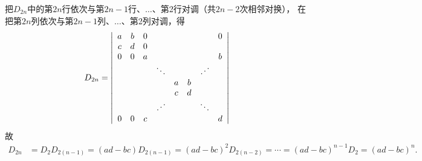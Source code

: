 \begin{jie}
  把$D_{2n}$中的第$2n$行依次与第$2n-1$行、$\ldots$、第2行对调（共$2n-2$次相邻对换），
  在把第$2n$列依次与第$2n-1$列、$\ldots$、第2列对调，得
  $$
  D_{2n} = \left|
    \begin{array}{cccccccc}
      a & b & 0 &      & & & &0 \\
      c & d & 0 & & &  & &\\
      0 & 0 & a & & &  & & b \\
        &   &   & \ddots &  &  & \iddots &   \\
        &   &   &     & a& b& & \\
        &   &   &     & c& d& & \\
        &   &   & \iddots &  &  & \ddots &   \\
      0 & 0 & c & & &  & & d
    \end{array}
  \right|
  $$
  故
  $$
  \begin{aligned}
    D_{2n} & = D_2 D_{2(n-1)}  
    = (ad-bc)D_{2(n-1)} 
    = (ad-bc)^2 D_{2(n-2)}
    = \cdots 
    = (ad-bc)^{n-1}D_{2} 
    = (ad-bc)^n.      
  \end{aligned}
  $$
\end{jie}


